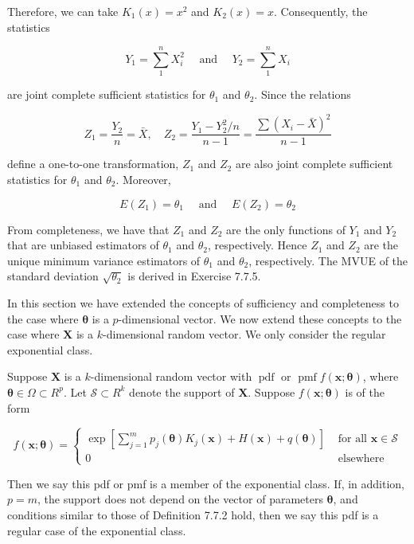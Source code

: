 Therefore, we can take $K_{1}(x)=x^{2}$ and $K_{2}(x)=x$. Consequently, the statistics

$$
Y_{1}=\sum_{1}^{n} X_{i}^{2} \quad \text { and } \quad Y_{2}=\sum_{1}^{n} X_{i}
$$

are joint complete sufficient statistics for $\theta_{1}$ and $\theta_{2}$. Since the relations

$$
Z_{1}=\frac{Y_{2}}{n}=\bar{X}, \quad Z_{2}=\frac{Y_{1}-Y_{2}^{2} / n}{n-1}=\frac{\sum\left(X_{i}-\bar{X}\right)^{2}}{n-1}
$$

define a one-to-one transformation, $Z_{1}$ and $Z_{2}$ are also joint complete sufficient statistics for $\theta_{1}$ and $\theta_{2}$. Moreover,

$$
E\left(Z_{1}\right)=\theta_{1} \quad \text { and } \quad E\left(Z_{2}\right)=\theta_{2}
$$

From completeness, we have that $Z_{1}$ and $Z_{2}$ are the only functions of $Y_{1}$ and $Y_{2}$ that are unbiased estimators of $\theta_{1}$ and $\theta_{2}$, respectively. Hence $Z_{1}$ and $Z_{2}$ are the unique minimum variance estimators of $\theta_{1}$ and $\theta_{2}$, respectively. The MVUE of the standard deviation $\sqrt{\theta_{2}}$ is derived in Exercise 7.7.5.

In this section we have extended the concepts of sufficiency and completeness to the case where $\boldsymbol{\theta}$ is a $p$-dimensional vector. We now extend these concepts to the case where $\mathbf{X}$ is a $k$-dimensional random vector. We only consider the regular exponential class.

Suppose $\mathbf{X}$ is a $k$-dimensional random vector with $\operatorname{pdf}$ or $\operatorname{pmf} f(\mathbf{x} ; \boldsymbol{\theta})$, where $\boldsymbol{\theta} \in \Omega \subset R^{p}$. Let $\mathcal{S} \subset R^{k}$ denote the support of $\mathbf{X}$. Suppose $f(\mathbf{x} ; \boldsymbol{\theta})$ is of the form

\[
f(\mathbf{x} ; \boldsymbol{\theta})= \begin{cases}\exp \left[\sum_{j=1}^{m} p_{j}(\boldsymbol{\theta}) K_{j}(\mathbf{x})+H(\mathbf{x})+q(\boldsymbol{\theta})\right] & \text { for all } \mathbf{x} \in \mathcal{S}  \tag{7.7.5}\\ 0 & \text { elsewhere }\end{cases}
\]

Then we say this pdf or pmf is a member of the exponential class. If, in addition, $p=m$, the support does not depend on the vector of parameters $\boldsymbol{\theta}$, and conditions similar to those of Definition 7.7.2 hold, then we say this pdf is a regular case of the exponential class.

